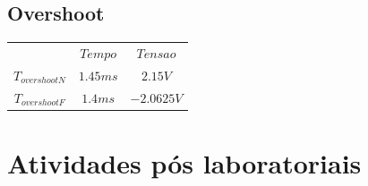 \documentclass[12pt,twoside, a4paper, twocolumn]{article}
\begin{document}
\subsection{Overshoot}

\begin{center}
    \begin{tabular}{ |ccc| }
        \hline
        $\,$             & $Tempo$  & $Tensao$   \\
        $T_{overshootN}$ & $1.45ms$ & $2.15V$    \\
        $T_{overshootF}$ & $1.4ms$  & $-2.0625V$ \\
        \hline
    \end{tabular}
\end{center}

\newpage
\section{Atividades pós laboratoriais}
\end{document}
